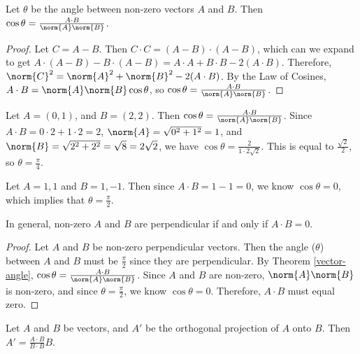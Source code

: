 \documentclass[12pt]{article}
\begin{document}
\begin{thm}
    Let $\theta$ be the angle between non-zero vectors $A$ and $B$. Then $\cos\theta = \frac{A \cdot B}{\norm{A}\norm{B}}$.
\end{thm}

\begin{proof}\label{vector-angle}
    Let $C = A - B$. Then $C \cdot C = (A - B) \cdot (A - B)$, which can we expand to get $A \cdot (A - B) - B \cdot (A - B) = A \cdot A + B \cdot B - 2(A \cdot B)$. Therefore, $\norm{C}^2 = \norm{A}^2 + \norm{B}^2 - 2(A \cdot B)$. By the Law of Cosines, $A \cdot B = \norm{A}\norm{B}\cos\theta$, so $\cos\theta = \frac{A \cdot B}{\norm{A}\norm{B}}$.
\end{proof}

\begin{exmp}
    Let $A = \left(0, 1\right)$, and $B = \left(2, 2\right)$. Then $\cos\theta = \frac{A \cdot B}{\norm{A}\norm{B}}$. Since $A \cdot B = 0 \cdot 2 + 1 \cdot 2 = 2$, $\norm{A} = \sqrt{0^2 + 1^2} = 1$, and $\norm{B} = \sqrt{2^2 + 2^2} = \sqrt{8} = 2\sqrt{2}$, we have $\cos\theta = \frac{2}{1 \cdot 2\sqrt{2}}$. This is equal to $\frac{\sqrt{2}}{2}$, so $\theta = \frac{\pi}{4}$.
\end{exmp}

\begin{exmp}
    Let $A = {1, 1}$ and $B = {1, -1}$. Then since $A \cdot B = 1 - 1 = 0$, we know $\cos\theta = 0$, which implies that $\theta = \frac{\pi}{2}$.
\end{exmp}

\begin{cor}\label{perpendicular-vectors}
    In general, non-zero $A$ and $B$ are perpendicular if and only if $A \cdot B = 0$.
\end{cor}

\begin{proof}
    Let $A$ and $B$ be non-zero perpendicular vectors. Then the angle ($\theta$) between $A$ and $B$ must be $\frac{\pi}{2}$ since they are perpendicular. By Theorem \ref{vector-angle}, $\cos\theta = \frac{A \cdot B}{\norm{A}\norm{B}}$. Since $A$ and $B$ are non-zero, $\norm{A}\norm{B}$ is non-zero, and since $\theta = \frac{\pi}{2}$, we know $\cos\theta = 0$. Therefore, $A \cdot B$ must equal zero.
\end{proof}

\begin{thm}\label{vector-projection}
    Let $A$ and $B$ be vectors, and $A'$ be the orthogonal projection of $A$ onto $B$. Then $A' = \frac{A \cdot B}{B \cdot B}B$.
\end{thm}
\end{document}
